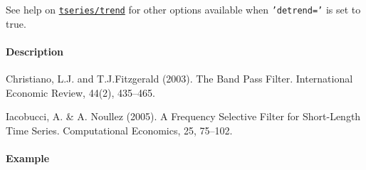 See help on \href{tseries/trend}{\texttt{tseries/trend}} for other
options available when \texttt{'detrend='} is set to true.

\paragraph{Description}

Christiano, L.J. and T.J.Fitzgerald (2003). The Band Pass Filter.
International Economic Review, 44(2), 435--465.

Iacobucci, A. \& A. Noullez (2005). A Frequency Selective Filter for
Short-Length Time Series. Computational Economics, 25, 75--102.

\paragraph{Example}


